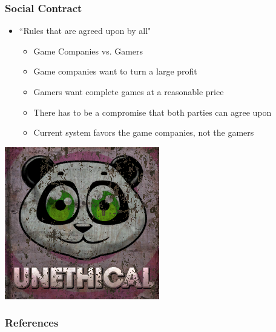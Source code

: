 \documentclass{beamer}
\begin{document}
\begin{frame}
\frametitle{Social Contract}
\begin{itemize}
\item ``Rules that are agreed upon by all"
\pause
\begin{itemize}
\item Game Companies vs. Gamers
\pause
\item Game companies want to turn a large profit
\pause
\item Gamers want complete games at a reasonable price
\pause
\item There has to be a compromise that both parties can agree upon
\pause
\item Current system favors the game companies, not the gamers
\end{itemize}
\end{itemize}
\begin{center}
\includegraphics[scale=0.3]{unethical}
\end{center}
\end{frame}

\begin{frame}[shrink=20]
\frametitle{References}
\vspace{1cm}
\nocite{*}


\end{frame}
\end{document}
